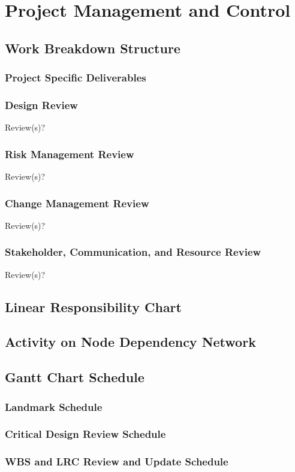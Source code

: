 \chapter{Project Management and Control}
\section{Work Breakdown Structure}
\subsection{Project Specific Deliverables}
\subsection{Design Review}
Review(s)?
\subsection{Risk Management Review}
Review(s)?
\subsection{Change Management Review}
Review(s)?
\subsection{Stakeholder, Communication, and Resource Review}
Review(s)?
\section{Linear Responsibility Chart}
\section{Activity on Node Dependency Network}
\section{Gantt Chart Schedule}
\subsection{Landmark Schedule}
\subsection{Critical Design Review Schedule}
\subsection{WBS and LRC Review and Update Schedule}